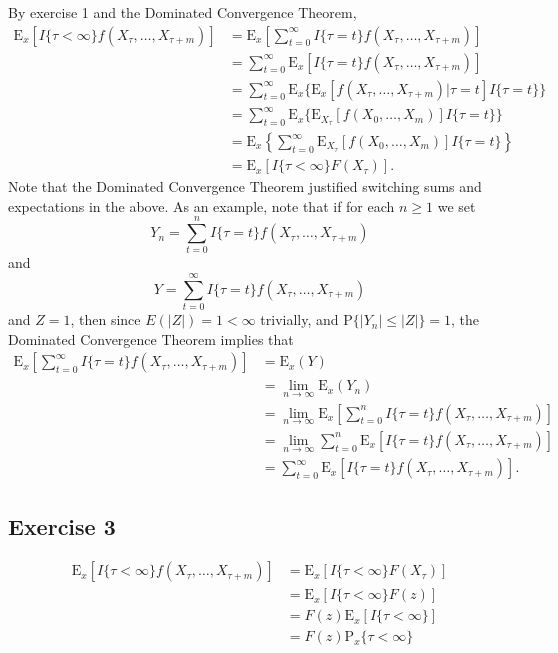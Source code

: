 \documentclass[12pt]{article}
\newcommand{\E}{\mathrm{E}}
\newcommand{\Prob}{\mathrm{P}}
\begin{document}
By exercise 1 and the Dominated Convergence Theorem,
\begin{align*}
\E_x[I\{\tau < \infty\} f(X_\tau, \ldots, X_{\tau + m})] &= \E_x \left[\sum_{t=0}^\infty I\{\tau = t\} f(X_\tau, \ldots, X_{\tau + m})\right] \\
&= \sum_{t=0}^\infty \E_x[I\{\tau = t\} f(X_\tau, \ldots, X_{\tau + m})] \\
&= \sum_{t=0}^\infty \E_x \{ \E_x[f(X_\tau, \ldots, X_{\tau + m}) | \tau = t] I\{\tau = t\}\} \\
&= \sum_{t=0}^\infty \E_x \{ \E_{X_\tau} [f(X_0, \ldots, X_m)] I\{\tau = t\}\} \\
&= \E_x \left\{\sum_{t=0}^\infty \E_{X_\tau} [f(X_0, \ldots, X_m)] I\{\tau = t\} \right\} \\
&= \E_x [I\{\tau < \infty\} F(X_\tau)].
\end{align*}
Note that the Dominated Convergence Theorem justified switching sums and expectations in the above. As an example, note that if for each $n \geq 1$ we set
\begin{equation*}
Y_n = \sum_{t=0}^n I\{\tau = t\} f(X_\tau, \ldots, X_{\tau+m})
\end{equation*}
and
\begin{equation*}
Y = \sum_{t=0}^\infty I\{\tau = t\} f(X_\tau, \ldots, X_{\tau+m})
\end{equation*}
and $Z = 1$, then since $E(|Z|) = 1 < \infty$ trivially, and $\Prob\{|Y_n| \leq |Z|\} = 1$, the Dominated Convergence Theorem implies that
\begin{align*}
\E_x \left[\sum_{t=0}^\infty I\{\tau = t\} f(X_\tau, \ldots, X_{\tau+m}) \right] &= \E_x(Y) \\
&= \lim_{n \to \infty} \E_x(Y_n) \\
&= \lim_{n \to \infty} \E_x \left[\sum_{t=0}^n I\{\tau = t\} f(X_\tau, \ldots, X_{\tau+m}) \right] \\
&= \lim_{n \to \infty} \sum_{t=0}^n \E_x [I\{\tau = t\} f(X_\tau, \ldots, X_{\tau+m})] \\
&= \sum_{t=0}^\infty \E_x [I\{\tau = t\} f(X_\tau, \ldots, X_{\tau+m})].
\end{align*}

\subsection*{Exercise 3}

\begin{align*}
\E_x[I\{\tau < \infty\} f(X_\tau, \ldots, X_{\tau + m})] &= \E_x [I\{\tau < \infty\} F(X_\tau)] \\
&= \E_x[I\{\tau < \infty\} F(z)] \\
&= F(z) \E_x[I\{\tau < \infty\}] \\
&= F(z) \Prob_x\{\tau < \infty\} \\
\end{align*}
\end{document}
